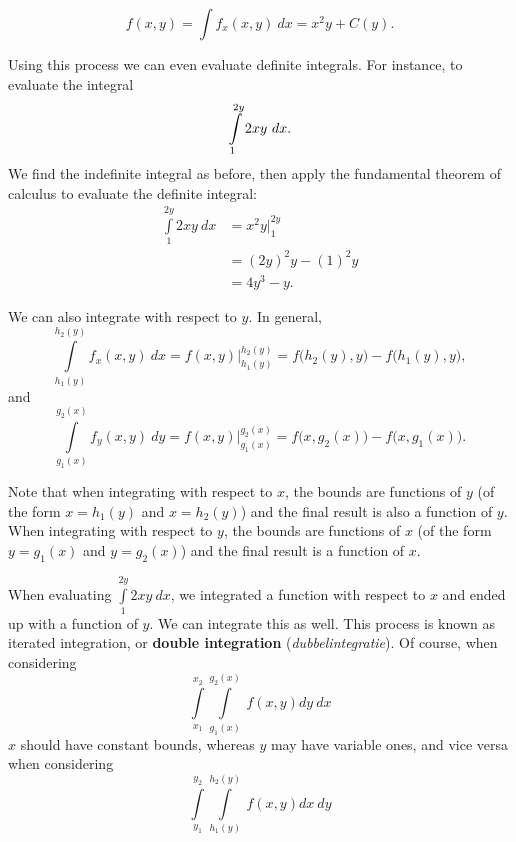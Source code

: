 $$f(x,y) = \int\limits f_x(x,y)\ dx  = x^2y+C(y).$$

Using this process we can even evaluate definite integrals. For instance, to evaluate the integral 
$$\displaystyle \int\limits_1^{2y} 2xy\ dx.$$
We find the indefinite integral as before, then apply the fundamental theorem of calculus to evaluate the definite integral:
\begin{align*}
\int\limits_1^{2y} 2xy\ dx &= x^2y\Big|_1^{2y}\\
			&= (2y)^2y - (1)^2y \\
			&= 4y^3-y.
\end{align*}

We can also integrate with respect to $y$. In general,
$$\int\limits_{h_1(y)}^{h_2(y)} f_x(x,y)\ dx = f(x,y)\Big|_{h_1(y)}^{h_2(y)} = f\big(h_2(y),y\big)-f\big(h_1(y),y\big),$$
and
$$\int\limits_{g_1(x)}^{g_2(x)} f_y(x,y)\ dy = f(x,y)\Big|_{g_1(x)}^{g_2(x)} = f\big(x,g_2(x)\big)-f\big(x,g_1(x)\big).$$

Note that when integrating with respect to $x$, the bounds are functions of $y$ (of the form $x=h_1(y)$ and $x=h_2(y)$) and the final result is also a function of $y$. When integrating with respect to $y$, the bounds are functions of $x$ (of the form $y=g_1(x)$ and $y=g_2(x)$) and the final result is a function of $x$. 

When evaluating $\int\limits_1^{2y} 2xy\ dx$,  we integrated a function with respect to $x$ and ended up with a function of $y$. We can integrate this as well. This process is known as iterated integration, or \textbf{double integration} (\textit{dubbelintegratie}). Of course,  when considering 
 $$\int\limits_{x_1}^{x_2}\int\limits_{g_1(x)}^{g_2(x)} \ f(x,y) dy\ dx$$
 $x$ should have constant bounds, whereas $y$ may have variable ones, and vice versa when considering
 $$\int\limits_{y_1}^{y_2}\int\limits_{h_1(y)}^{h_2(y)} \ f(x,y) dx\ dy$$

